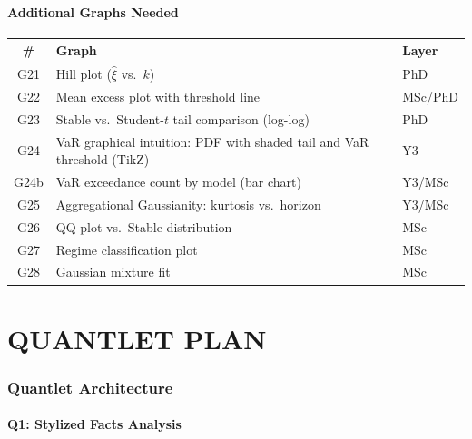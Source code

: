 \documentclass[11pt, a4paper]{article}
\theoremstyle{definition}
\begin{document}
\subsection{Additional Graphs Needed}

\begin{center}
\renewcommand{\arraystretch}{1.3}
\begin{tabular}{c l l}
\toprule
\textbf{\#} & \textbf{Graph} & \textbf{Layer} \\
\midrule
G21 & Hill plot ($\hat{\xi}$ vs.\ $k$) & PhD \\
G22 & Mean excess plot with threshold line & MSc/PhD \\
G23 & Stable vs.\ Student-$t$ tail comparison (log-log) & PhD \\
G24 & VaR graphical intuition: PDF with shaded tail and VaR threshold (TikZ) & Y3 \\
G24b & VaR exceedance count by model (bar chart) & Y3/MSc \\
G25 & Aggregational Gaussianity: kurtosis vs.\ horizon & Y3/MSc \\
G26 & QQ-plot vs.\ Stable distribution & MSc \\
G27 & Regime classification plot & MSc \\
G28 & Gaussian mixture fit & MSc \\
\bottomrule
\end{tabular}
\end{center}


\part{QUANTLET PLAN}

\section{Quantlet Architecture}

\subsection{Q1: Stylized Facts Analysis}
\end{document}
